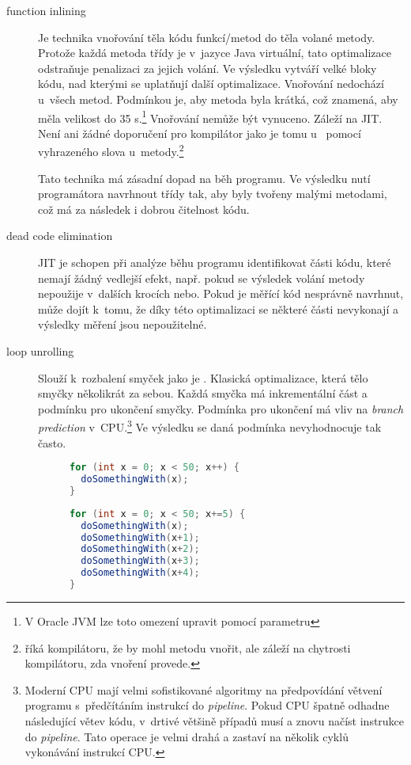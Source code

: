 \begin{description}
\item[function inlining] Je technika vnořování těla kódu funkcí/metod do těla volané metody. Protože každá metoda třídy je v~jazyce Java virtuální, tato optimalizace odstraňuje penalizaci za jejich volání. Ve výsledku vytváří velké bloky kódu, nad kterými se uplatňují další optimalizace. Vnořování nedochází u~všech metod. Podmínkou je, aby metoda byla krátká, což znamená, aby měla velikost do 35 \bytecode s.\footnote{V Oracle JVM lze toto omezení upravit pomocí parametru } Vnořování nemůže být vynuceno. Záleží na JIT. Není ani žádné doporučení pro kompilátor jako je tomu u~\CC{} pomocí vyhrazeného slova  u~metody.\footnote{ říká kompilátoru, že by mohl metodu vnořit, ale záleží na chytrosti kompilátoru, zda vnoření provede\cite{Stroustrup:1997:CPL:523265}.}

Tato technika má zásadní dopad na běh programu. Ve výsledku nutí programátora navrhnout třídy tak, aby byly tvořeny malými metodami, což má za následek i dobrou čitelnost kódu.

\item[dead code elimination] JIT je schopen při analýze běhu programu identifikovat části kódu, které nemají žádný vedlejší efekt, např. pokud se výsledek volání metody nepoužije v~dalších krocích nebo. Pokud je měřící kód nesprávně navrhnut, může dojít k~tomu, že díky této optimalizaci se některé části nevykonají a výsledky měření jsou nepoužitelné.

\item[loop unrolling] Slouží k~rozbalení smyček jako je . Klasická optimalizace, která tělo smyčky  několikrát za sebou. Každá smyčka má inkrementální část a podmínku pro ukončení smyčky. Podmínka pro ukončení má vliv na \emph{branch prediction} v~CPU.\footnote{Moderní CPU mají velmi sofistikované algoritmy na předpovídání větvení programu s~předčítáním instrukcí do \emph{pipeline}. Pokud CPU špatně odhadne následující větev kódu, v~drtivé většině případů musí  a znovu načíst instrukce do \emph{pipeline}. Tato operace je velmi drahá a zastaví na několik cyklů vykonávání instrukcí CPU.} Ve výsledku se daná podmínka nevyhodnocuje tak často.

\begin{figure}
\begin{lstlisting}[frame=single,language=Java,caption=Před loop unrolling]
for (int x = 0; x < 50; x++) {
  doSomethingWith(x);
}
\end{lstlisting}
\begin{lstlisting}[frame=single,language=Java,caption=Po loop unrolling]
for (int x = 0; x < 50; x+=5) {
  doSomethingWith(x);
  doSomethingWith(x+1);
  doSomethingWith(x+2);
  doSomethingWith(x+3);
  doSomethingWith(x+4);
}
\end{lstlisting}
\end{figure}
\end{description}

